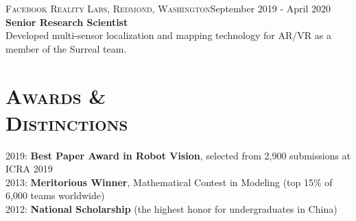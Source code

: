 \documentclass[margin, line]{res} %
\begin{document}
\begin{resume}
\textsc{Facebook Reality Labs, Redmond, Washington}\hfill September 2019 - April 2020 \\
\textbf{Senior Research Scientist}\\
Developed multi-sensor localization and mapping technology for AR/VR as a member of the Surreal team.







\section{\textsc{Awards \&\\Distinctions}}
2019: {\bf Best Paper Award in Robot Vision}, selected from 2,900 submissions at ICRA 2019\\
2013: {\bf Meritorious Winner}, Mathematical Contest in Modeling (top 15\% of 6,000 teams worldwide)\\
2012: {\bf National Scholarship} (the highest honor for undergraduates in China)


\end{resume}
\end{document}
